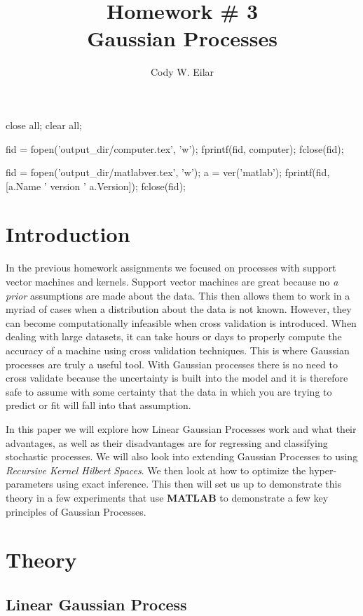 \documentclass[11pt, twoside]{article}   	%
\title{Homework \# 3 \\ Gaussian Processes}
\author{Cody W. Eilar}
\newenvironment{matlab}{\comment}{\endcomment}
\begin{document}
\maketitle


\begin{matlab}
close all; 
clear all;

fid = fopen('output_dir/computer.tex', 'w'); 
fprintf(fid, computer); 
fclose(fid); 

fid = fopen('output_dir/matlabver.tex', 'w'); 
a = ver('matlab'); 
fprintf(fid, [a.Name ' version ' a.Version]); 
fclose(fid); 
\end{matlab}

\section{Introduction} 
In the previous homework assignments we focused on processes with support vector machines
and kernels. Support vector machines are great because no \textit{a prior} assumptions
are made about the data. This then allows them to work in a myriad of cases when a
distribution about the data is not known. However, they can become computationally 
infeasible when cross validation is introduced. When dealing with large datasets, it can
take hours or days to properly compute the accuracy of a machine using cross validation 
techniques. This is where Gaussian processes are truly a useful tool. With Gaussian processes
there is no need to cross validate because the uncertainty is built into the model and it 
is therefore safe to assume with some certainty that the data in which you are trying to 
predict or fit will fall into that assumption.

In this paper we will explore how Linear Gaussian Processes work and what their advantages, 
as well as their disadvantages are for regressing and classifying stochastic processes. 
We will also look into extending Gaussian Processes to using \textit{Recursive Kernel Hilbert
Spaces}. We then look at how to optimize the hyper-parameters using exact inference. 
This then will set us up to demonstrate this theory in a few experiments that use
\textbf{MATLAB} to demonstrate a few key principles of Gaussian Processes. 
\section{Theory}
\subsection{Linear Gaussian Process}
\end{document}
